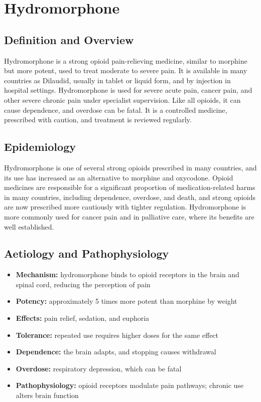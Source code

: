 \chapter{Hydromorphone}

\section*{Definition and Overview}
Hydromorphone is a strong opioid pain-relieving medicine, similar to morphine but more potent, used to treat moderate to severe pain. It is available in many countries as Dilaudid, usually in tablet or liquid form, and by injection in hospital settings. Hydromorphone is used for severe acute pain, cancer pain, and other severe chronic pain under specialist supervision. Like all opioids, it can cause dependence, and overdose can be fatal. It is a controlled medicine, prescribed with caution, and treatment is reviewed regularly.

\section*{Epidemiology}
Hydromorphone is one of several strong opioids prescribed in many countries, and its use has increased as an alternative to morphine and oxycodone. Opioid medicines are responsible for a significant proportion of medication-related harms in many countries, including dependence, overdose, and death, and strong opioids are now prescribed more cautiously with tighter regulation. Hydromorphone is more commonly used for cancer pain and in palliative care, where its benefits are well established.

\section*{Aetiology and Pathophysiology}
\begin{itemize}
    \item \textbf{Mechanism:} hydromorphone binds to opioid receptors in the brain and spinal cord, reducing the perception of pain
    \item \textbf{Potency:} approximately 5 times more potent than morphine by weight
    \item \textbf{Effects:} pain relief, sedation, and euphoria
    \item \textbf{Tolerance:} repeated use requires higher doses for the same effect
    \item \textbf{Dependence:} the brain adapts, and stopping causes withdrawal
    \item \textbf{Overdose:} respiratory depression, which can be fatal
    \item \textbf{Pathophysiology:} opioid receptors modulate pain pathways; chronic use alters brain function
\end{itemize}

